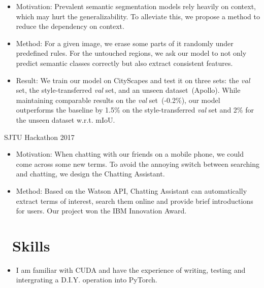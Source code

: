 \documentclass{resume}
\begin{document}
\vspace{-0.3em}
 {}
\vspace{-0.5em}
\begin{itemize}
	\item Motivation: Prevalent semantic segmentation models rely heavily on context, which may hurt the generalizability. To alleviate this, we propose a method to reduce the dependency on context.
	\item Method: For a given image, we erase some parts of it randomly under predefined rules. For the untouched regions, we ask our model to not only predict semantic classes correctly but also extract consistent features.
	\item Result: We train our model on CityScapes and test it on three sets: the \textit{val} set, the style-transferred \textit{val} set, and an unseen dataset~(Apollo). While maintaining comparable results on the \textit{val} set~(-0.2\%), our model outperforms the baseline by 1.5\% on the style-transferred \textit{val} set and 2\% for the unseen dataset w.r.t. mIoU.
\end{itemize}

\vspace{-0.3em}
 {SJTU Hackathon 2017}
\vspace{-0.5em}
\begin{itemize}
	\item Motivation: When chatting with our friends on a mobile phone, we could come across some new terms. To avoid the annoying switch between searching and chatting, we design the Chatting Assistant. 
	\item Method: Based on the Watson API, Chatting Assistant can automatically extract terms of interest, search them online and provide brief introductions for users. Our project won the IBM Innovation Award.
\end{itemize}



\section{\faCogs\ Skills}
\begin{itemize}[parsep=0.5ex]
  \item I am familiar with CUDA and have the experience of writing, testing and intergrating a D.I.Y. operation into PyTorch.
\end{itemize}
\end{document}
